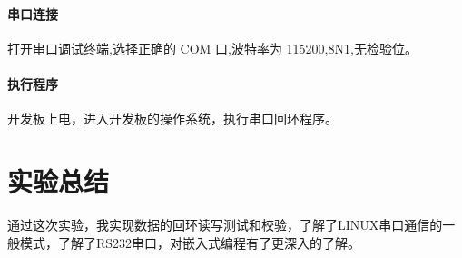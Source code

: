 \documentclass{embedding}
\begin{document}
\paragraph{串口连接}打开串口调试终端,选择正确的 COM 口,波特率为 115200,8N1,无检验位。

\paragraph{执行程序}开发板上电，进入开发板的操作系统，执行串口回环程序。

\section{实验总结}

通过这次实验，我实现数据的回环读写测试和校验，了解了LINUX串口通信的一般模式，了解了RS232串口，对嵌入式编程有了更深入的了解。 
\end{document}

